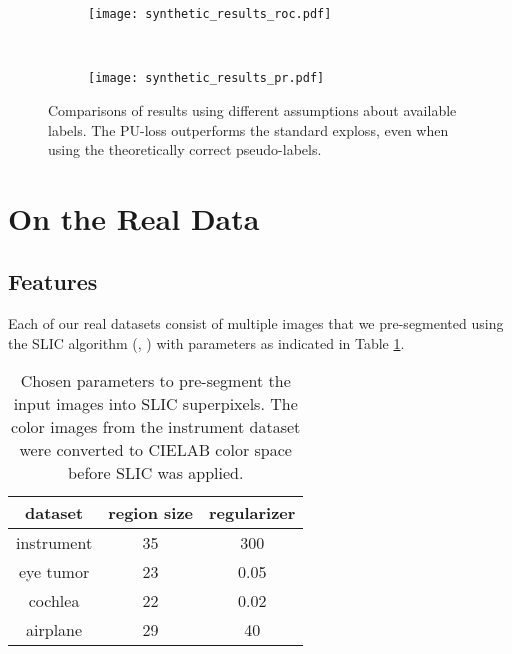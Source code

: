 \begin{figure}[ht]
	\centering
	\begin{subfigure}[h]{0.49\textwidth}
	\texttt{[image: synthetic\_results\_roc.pdf]}	
	\end{subfigure}
	~
	\begin{subfigure}[h]{0.49\textwidth}
	\texttt{[image: synthetic\_results\_pr.pdf]}	
	\end{subfigure}
	\caption{Comparisons of results using different assumptions about available labels. The PU-loss outperforms the standard exploss, even when using the theoretically correct pseudo-labels.}
	\label{fig:synthetic_results}
\end{figure}


\section{On the Real Data}
\label{sec:real-data}
\subsection{Features}
Each of our real datasets consist of multiple images that we pre-segmented using the SLIC algorithm (\cite{achanta2010slic}, \cite{vedaldi08vlfeat}) with parameters as indicated in Table \ref{tab:slic-params}. 

\begin{table}[ht]
	\centering
	  \caption{Chosen parameters to pre-segment the input images into SLIC superpixels. The color images from the instrument dataset were converted to CIELAB color space before SLIC was applied.}
	  \label{tab:slic-params}
	\begin{tabular}{ | c  c  c | }
	\hline
	  dataset	& region size & regularizer \\ \hline
	  instrument  	& 35 & 300 \\
	  eye tumor  	& 23 & 0.05 \\ 
	  cochlea	& 22 & 0.02 \\ 
	  airplane 	& 29 & 40 \\ \hline
	\end{tabular}
\end{table}

